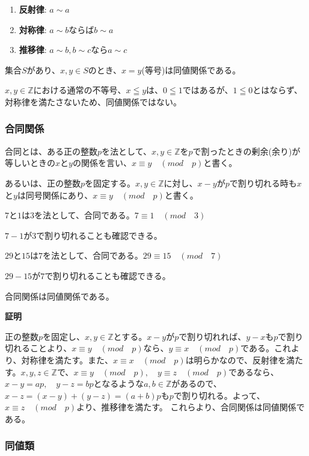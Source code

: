 \documentclass[dvipdfmx,autodetect-engine]{jsarticle}
\begin{document}
\begin{enumerate}
\renewcommand{\labelenumi}{(\arabic{enumi})}
\item {\bf 反射律}: $a \sim a$
\item {\bf 対称律}: $a \sim b$ならば$b \sim a$
\item {\bf 推移律}: $a \sim b, b \sim c$なら$a \sim c$
\end{enumerate}

\exam 集合$S$があり、$x, y \in S$のとき、$x = y$(等号)は同値関係である。

\exam $x, y \in \mathbb{Z}$における通常の不等号、$x \leqq y$は、$0 \leqq 1$ではあるが、$1 \leqq 0$とはならず、対称律を満たさないため、同値関係ではない。

\subsubsection{合同関係}

合同とは、ある正の整数$p$を法として、$x,y \in \mathbb{Z}$を$p$で割ったときの剰余(余り)が等しいときの$x$と$y$の関係を言い、$x \equiv y \quad (mod \quad p)$と書く。

あるいは、正の整数$p$を固定する。$x, y \in \mathbb{Z}$に対し、$x - y$が$p$で割り切れる時も$x$と$y$は同号関係にあり、$x \equiv y \quad (mod \quad p)$と書く。

\exam $7$と$1$は$3$を法として、合同である。$7 \equiv 1 \quad (mod \quad 3)$

$7 - 1$が$3$で割り切れることも確認できる。

\exam $29$と$15$は$7$を法として、合同である。$29 \equiv 15 \quad (mod \quad 7)$

$29 - 15$が$7$で割り切れることも確認できる。

\prop 合同関係は同値関係である。

{\bf 証明}

正の整数$p$を固定し、$x, y \in \mathbb{Z}$とする。$x - y$が$p$で割り切れれば、$y - x$も$p$で割り切れることより、$x \equiv y \quad (mod \quad p)$なら、$y \equiv x \quad (mod \quad p)$である。これより、対称律を満たす。また、$x \equiv x \quad (mod \quad p)$は明らかなので、反射律を満たす。$x, y, z \in \mathbb{Z}$で、$x \equiv y \quad (mod \quad p), \quad y \equiv z \quad (mod \quad p)$であるなら、$x-y = ap,\quad y-z=bp$となるような$a, b \in \mathbb{Z}$があるので、$x - z = (x - y) + (y - z) = (a + b)p$も$p$で割り切れる。よって、$x \equiv z \quad (mod \quad p)$より、推移律を満たす。
これらより、合同関係は同値関係である。

\subsubsection{同値類}
\end{document}
